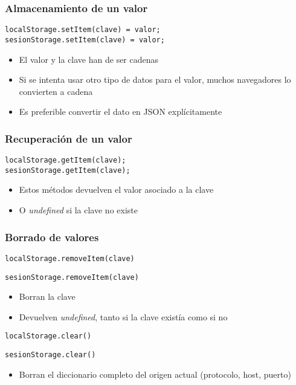 \documentclass[ucs]{beamer}
\begin{document}
\begin{frame}[fragile]
\frametitle{Almacenamiento de un valor}


  \begin{verbatim}
localStorage.setItem(clave) = valor;
sesionStorage.setItem(clave) = valor;
  \end{verbatim}


\begin{itemize}
\item
El valor y la clave han de ser cadenas 

\item
Si se intenta usar otro tipo de datos para el valor,
muchos navegadores lo convierten a cadena 

\item
Es preferible convertir el dato en JSON explícitamente
\end{itemize}
\end{frame}


\begin{frame}[fragile]
\frametitle{Recuperación de un valor}


  \begin{verbatim}
localStorage.getItem(clave);
sesionStorage.getItem(clave);
  \end{verbatim}

\begin{itemize}
\item
Estos métodos devuelven el valor asociado a la clave

\item
O \emph{undefined} si la clave no existe
\end{itemize}
\end{frame}


\begin{frame}[fragile]
\frametitle{Borrado de valores}

\verb|localStorage.removeItem(clave)|

\verb|sesionStorage.removeItem(clave)|

    \begin{itemize}
    \item
Borran la clave
    \item
Devuelven 
\emph{undefined}, tanto si la clave existía como si no
    \end{itemize}


\verb|localStorage.clear()|

\verb|sesionStorage.clear()|

\begin{itemize}
\item
Borran el diccionario completo del origen actual (protocolo, host, puerto)
\end{itemize}
\end{frame}
\end{document}
